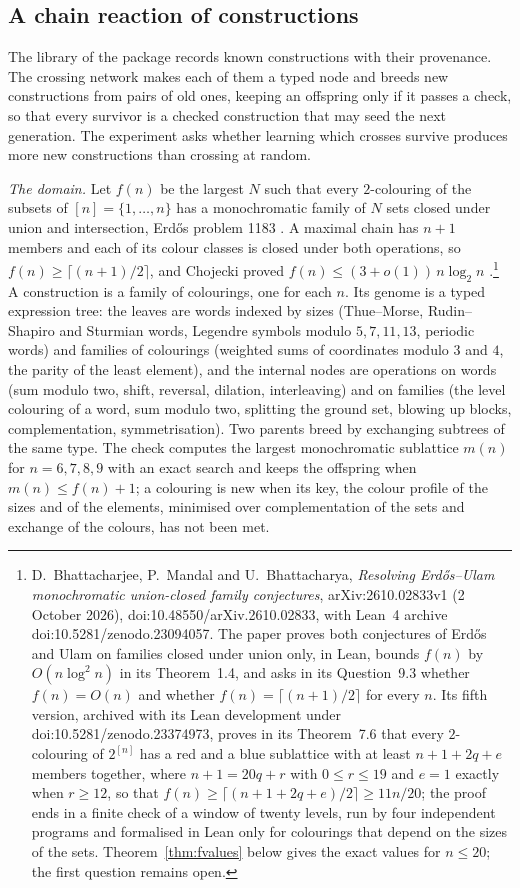 \subsection{A chain reaction of constructions}\label{ssec:crossing}

The library of the package records known constructions with their provenance. The crossing network makes each of them a typed node and breeds new constructions from pairs of old ones, keeping an offspring only if it passes a check, so that every survivor is a checked construction that may seed the next generation. The experiment asks whether learning which crosses survive produces more new constructions than crossing at random.

\emph{The domain.} Let $f(n)$ be the largest $N$ such that every $2$-colouring of the subsets of $[n]=\{1,\dots,n\}$ has a monochromatic family of $N$ sets closed under union and intersection, Erd\H{o}s problem 1183 \cite{Blo1183}. A maximal chain has $n+1$ members and each of its colour classes is closed under both operations, so $f(n)\ge\lceil(n+1)/2\rceil$, and Chojecki proved $f(n)\le(3+o(1))\,n\log_{2}n$ \cite{Cho26}.\footnote{D.~Bhattacharjee, P.~Mandal and U.~Bhattacharya, \emph{Resolving Erd\H{o}s--Ulam monochromatic union-closed family conjectures}, arXiv:2610.02833v1 (2 October 2026), doi:10.48550/arXiv.2610.02833, with Lean~4 archive doi:10.5281/zenodo.23094057. The paper proves both conjectures of Erd\H{o}s and Ulam on families closed under union only, in Lean, bounds $f(n)$ by $O(n\log^{2}n)$ in its Theorem~1.4, and asks in its Question~9.3 whether $f(n)=O(n)$ and whether $f(n)=\lceil(n+1)/2\rceil$ for every $n$. Its fifth version, archived with its Lean development under doi:10.5281/zenodo.23374973, proves in its Theorem~7.6 that every $2$-colouring of $2^{[n]}$ has a red and a blue sublattice with at least $n+1+2q+e$ members together, where $n+1=20q+r$ with $0\le r\le19$ and $e=1$ exactly when $r\ge12$, so that $f(n)\ge\lceil(n+1+2q+e)/2\rceil\ge11n/20$; the proof ends in a finite check of a window of twenty levels, run by four independent programs and formalised in Lean only for colourings that depend on the sizes of the sets. Theorem~\ref{thm:fvalues} below gives the exact values for $n\le20$; the first question remains open.} A construction is a family of colourings, one for each $n$. Its genome is a typed expression tree: the leaves are words indexed by sizes (Thue--Morse, Rudin--Shapiro and Sturmian words, Legendre symbols modulo $5,7,11,13$, periodic words) and families of colourings (weighted sums of coordinates modulo $3$ and $4$, the parity of the least element), and the internal nodes are operations on words (sum modulo two, shift, reversal, dilation, interleaving) and on families (the level colouring of a word, sum modulo two, splitting the ground set, blowing up blocks, complementation, symmetrisation). Two parents breed by exchanging subtrees of the same type. The check computes the largest monochromatic sublattice $m(n)$ for $n=6,7,8,9$ with an exact search and keeps the offspring when $m(n)\le f(n)+1$; a colouring is new when its key, the colour profile of the sizes and of the elements, minimised over complementation of the sets and exchange of the colours, has not been met.

